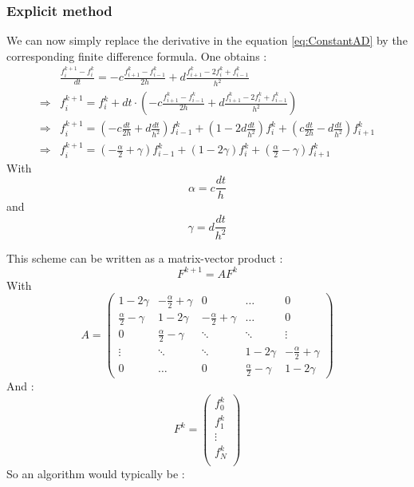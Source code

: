 \documentclass[11pt,a4paper]{article}
\begin{document}
\subsubsection{Explicit method}
We can now simply replace the derivative in the equation \ref{eq:ConstantAD} by the corresponding finite difference formula. One obtains :
\begin{align}\label{eq:ExplicitCentered}
&\frac{f_i^{k+1} - f_i^{k}}{dt} = - c \frac{f_{i+1}^{k} - f_{i-1}^{k}}{2h} 
								 + d \frac{f_{i+1}^{k} - 2 f_{i}^{k} + f_{i-1}^{k}}{h^{2}} \\
\Rightarrow & f_i^{k+1} = f_i^{k} + dt \cdot (- c \frac{f_{i+1}^{k} - f_{i-1}^{k}}{2h} 
								 + d \frac{f_{i+1}^{k} - 2 f_{i}^{k} + f_{i-1}^{k}}{h^{2}} ) \\
\Rightarrow & f_i^{k+1} =  \left( -c \frac{dt}{2h} + d \frac{dt}{h^2} \right) f_{i-1}^{k} 
							+ \left(1 - 2 d \frac{dt}{h^2} \right) f_{i}^{k} 
							+ \left( c \frac{dt}{2h} - d \frac{dt}{h^2} \right) f_{i+1}^{k}  \\
\Rightarrow & f_i^{k+1} =  \left( -\frac{\alpha}{2} + \gamma \right) f_{i-1}^{k} 
							+ \left(1 - 2 \gamma \right) f_{i}^{k} 
							+ \left( \frac{\alpha}{2} -  \gamma \right) f_{i+1}^{k} 
\end{align} 
With \[\alpha = c \frac{dt}{h} \]
and \[\gamma = d \frac{dt}{h^2} \]

This scheme can be written as a matrix-vector product : 
\[F^{k+1} = A F^k\]
With \[
A = \begin{pmatrix}
      1-2\gamma & -\frac{\alpha}{2} + \gamma & 0   & \dots     & 0   \\
      \frac{\alpha}{2} -  \gamma & 1-2\gamma       & -\frac{\alpha}{2} + \gamma   & \dots     & 0 \\
      0&         \frac{\alpha}{2} -  \gamma& \ddots         & \ddots    & \vdots    \\
      \vdots&         \ddots&           \ddots &     1-2\gamma      & -\frac{\alpha}{2} + \gamma  \\
      0&         \dots&           0&          \frac{\alpha}{2} -  \gamma & 1-2\gamma
  \end{pmatrix}
\]
And : \[
F^k =  \begin{pmatrix}
f_0^k \\
f_1^k \\
\vdots \\
f_N^k \\
\end{pmatrix}
\]
So an algorithm would typically be : 
\end{document}
